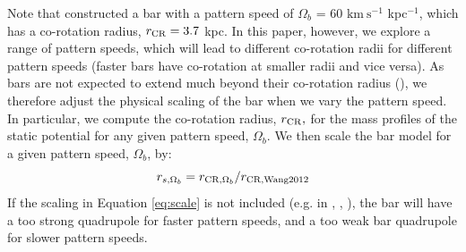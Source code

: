 \documentclass[twocolumn]{aastex62}
\newcommand{\msun}{\textrm{M}_\odot}
\newcommand{\kms}{\ensuremath{\textrm{km}~\textrm{s}^{-1}}}
\newcommand{\todo}[1]{{\color{red} TODO: #1}}
\begin{document}
Note that \citet{wang:2012} constructed a bar with a pattern speed of $\Omega_b$ =  60 $\kms$ kpc$^{-1}$, which has a co-rotation radius, $r_{\rm CR} = 3.7$ kpc.
In this paper, however, we explore a range of pattern speeds, which will lead to different co-rotation radii for different pattern speeds (faster bars have co-rotation at smaller radii and vice versa).
As bars are not expected to extend much beyond their co-rotation radius (\citealt{binney:2008}), we therefore adjust the physical scaling of the bar when we vary the pattern speed. %
In particular, we compute the co-rotation radius, $r_{\rm CR},$ for the mass profiles of the static potential for any given pattern speed, $\Omega_b$.
We then scale the bar model for a given pattern speed, $\Omega_b$, by:
\begin{equation}\label{eq:scale}
r_{s, \Omega_b}  = r_{{\rm CR}, \Omega_b}/r_{{\rm CR, Wang 2012}}
\end{equation}
If the scaling in Equation \ref{eq:scale} is not included (e.g. in %
\citealt{Pearson:2017}, \citealt{Erkal:2017}, \citealt{Banik:2019}), the bar will have a too strong quadrupole for faster pattern speeds, and a too weak bar quadrupole for  slower pattern speeds.

%
\end{document}
